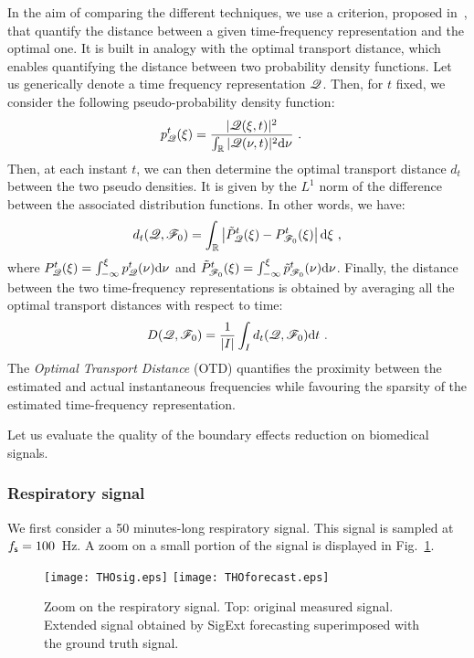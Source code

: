 In the aim of comparing the different techniques, we use a criterion, proposed in~\cite{Daubechies16conceft}, that quantify the distance between a given time-frequency representation and the optimal one. It is built in analogy with the optimal transport distance, which enables quantifying the distance between two probability density functions. Let us generically denote a time frequency representation ${\mathscr Q}$. Then, for $t$ fixed, we consider the following pseudo-probability density function:
\begin{align}
p_\ccQ^t(\xi) &= \dfrac{|\ccQ(\xi,t)|^2}{\int_\RR |\ccQ(\nu,t)|^2\dd\nu}\ .
\label{eq:ppdf}
\end{align}
Then, at each instant $t$, we can then determine the optimal transport distance $d_{t}$ between the two pseudo densities. It is given by the $L^1$ norm of the difference between the associated distribution functions. In other words, we have:
\begin{equation*}
d_{t}(\ccQ,\ccF_0) = \int_\RR\left|\tilde P_{\ccQ}^t(\xi)-  P_{\ccF_0}^t(\xi)\right|\dd\xi\ ,
\end{equation*}
where $P_{{\mathscr Q}}^t(\xi)=\int_{-\infty}^\xi p_{{\mathscr Q}}^t(\nu)\mathrm{d}\nu$ and $\tilde P_{{\mathscr F}_0}^t(\xi)=\int_{-\infty}^\xi\tilde p_{{\mathscr F}_0}^t(\nu)\mathrm{d}\nu$.
Finally, the distance between the two time-frequency representations is obtained by averaging all the optimal transport distances with respect to time:
\begin{equation}
D({\mathscr Q},{\mathscr F}_0) = \frac1{|I|}\int_I d_{t}({\mathscr Q},{\mathscr F}_0)\mathrm{d}t\ .
\end{equation}
The \textit{Optimal Transport Distance} (OTD) quantifies the proximity between the estimated and actual instantaneous frequencies while favouring the sparsity of the estimated time-frequency representation.

Let us evaluate the quality of the boundary effects reduction on biomedical signals.


\subsubsection{Respiratory signal}
We first consider a 50 minutes-long respiratory signal. This signal is sampled at $f_{\mathsf s}=100$~Hz. A zoom on a small portion of the signal is displayed in Fig.~\ref{fig:tho}.

\begin{figure}
\texttt{[image: THOsig.eps]}
\texttt{[image: THOforecast.eps]}
\caption{Zoom on the respiratory signal. Top: original measured signal. Extended signal obtained by {\sf SigExt} forecasting superimposed with the ground truth signal.}
\label{fig:tho}
\end{figure}

